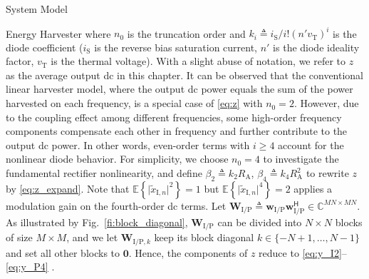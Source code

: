 \begin{section}{System Model}
\begin{subsection}{Energy Harvester}
		where $n_0$ is the truncation order and $k_i \triangleq i_{\mathrm{S}}/i!(n'v_{\mathrm{T}})^i$ is the diode coefficient ($i_{\mathrm{S}}$ is the reverse bias saturation current, $n'$ is the diode ideality factor, $v_{\mathrm{T}}$ is the thermal voltage). With a slight abuse of notation, we refer to $z$ as the average output \gls{dc} in this chapter. It can be observed that the conventional linear harvester model, where the output \gls{dc} power equals the sum of the power harvested on each frequency, is a special case of \eqref{eq:z} with $n_0=2$. However, due to the coupling effect among different frequencies, some high-order frequency components compensate each other in frequency and further contribute to the output \gls{dc} power. In other words, even-order terms with $i \ge 4$ account for the nonlinear diode behavior. For simplicity, we choose $n_0=4$ to investigate the fundamental rectifier nonlinearity, and define $\beta_2 \triangleq {k_2}{R_{\mathrm{A}}}$, $\beta_4 \triangleq {k_4}{R_{\mathrm{A}}^2}$ to rewrite $z$ by \eqref{eq:z_expand}. Note that $\mathbb{E}\left\{\lvert\tilde{x}_{\mathrm{I},n}\rvert^2\right\}=1$ but $\mathbb{E}\left\{\lvert\tilde{x}_{\mathrm{I},n}\rvert^4\right\}=2$ applies a modulation gain on the fourth-order \gls{dc} terms. Let $\mathbf{W}_{\mathrm{I/P}} \triangleq \mathbf{w}_{\mathrm{I/P}}\mathbf{w}_{\mathrm{I/P}}^\mathsf{H} \in \mathbb{C}^{MN \times MN}$. As illustrated by Fig.~\ref{fi:block_diagonal}, $\mathbf{W}_{\mathrm{I/P}}$ can be divided into $N \times N$ blocks of size $M \times M$, and we let $\mathbf{W}_{\mathrm{I/P},k}$ keep its block diagonal $k \in \{-N+1,\dots,N-1\}$ and set all other blocks to $\mathbf{0}$. Hence, the components of $z$ reduce to \eqref{eq:y_I2}--\eqref{eq:y_P4} \cite{Golub2013}.


\end{subsection}
\end{section}
